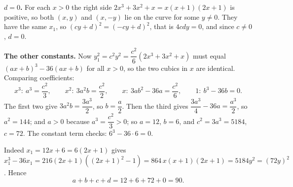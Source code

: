 \textbf{$d=0$.} For each $x>0$ the right side $2x^3+3x^2+x=x(x+1)(2x+1)$ is positive, so both $(x,y)$ and $(x,-y)$ lie on the curve for some $y\ne0$. They have the same $x_1$, so $(cy+d)^2=(-cy+d)^2$, that is $4cdy=0$, and since $c\ne0$, $d=0$.

\textbf{The other constants.} Now $y_1^2=c^2y^2=\dfrac{c^2}{6}(2x^3+3x^2+x)$ must equal $(ax+b)^3-36(ax+b)$ for all $x>0$, so the two cubics in $x$ are identical. Comparing coefficients:
\[
x^3:\ a^3=\dfrac{c^2}{3},\qquad x^2:\ 3a^2b=\dfrac{c^2}{2},\qquad x:\ 3ab^2-36a=\dfrac{c^2}{6},\qquad 1:\ b^3-36b=0 .
\]
The first two give $3a^2b=\dfrac{3a^3}{2}$, so $b=\dfrac{a}{2}$. Then the third gives $\dfrac{3a^3}{4}-36a=\dfrac{a^3}{2}$, so $a^2=144$; and $a>0$ because $a^3=\dfrac{c^2}{3}>0$; so $a=12$, $b=6$, and $c^2=3a^3=5184$, $c=72$. The constant term checks: $6^3-36\cdot6=0$.

Indeed $x_1=12x+6=6(2x+1)$ gives $x_1^3-36x_1=216(2x+1)\left((2x+1)^2-1\right)=864\,x(x+1)(2x+1)=5184y^2=(72y)^2$. Hence
\[
a+b+c+d=12+6+72+0=\boxed{90}.
\]
